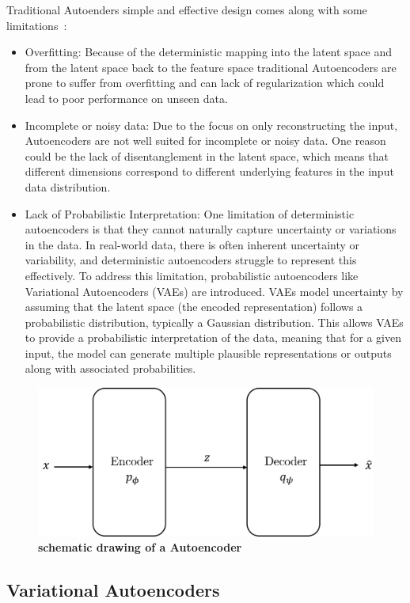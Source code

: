 Traditional Autoenders simple and effective design comes along with some limitations~\cite{pml2Book}:
\begin{itemize}
	\item Overfitting: Because of the deterministic mapping into the latent space and from the latent space back to the feature space traditional Autoencoders are prone to suffer from overfitting and can lack of regularization which could lead to poor performance on unseen data.
	\item Incomplete or noisy data: Due to the focus on only reconstructing the input, Autoencoders are not well suited for incomplete or noisy data. One reason could be the lack of disentanglement in the latent space, which means that different dimensions correspond to different underlying features in the input data distribution. 
	\item Lack of Probabilistic Interpretation: One limitation of deterministic autoencoders is that they cannot naturally capture uncertainty or variations in the data. In real-world data, there is often inherent uncertainty or variability, and deterministic autoencoders struggle to represent this effectively. To address this limitation, probabilistic autoencoders like Variational Autoencoders (VAEs) are introduced. VAEs model uncertainty by assuming that the latent space (the encoded representation) follows a probabilistic distribution, typically a Gaussian distribution. This allows VAEs to provide a probabilistic interpretation of the data, meaning that for a given input, the model can generate multiple plausible representations or outputs along with associated probabilities.
\end{itemize}
\begin{figure}
    \centering
    \includegraphics[width=0.5\linewidth]{figures/background/Autoencoder.png}
    \caption[Autoencoder schematics]{\textbf{schematic drawing of a Autoencoder}}
    \label{fig:Autoencoder_schematics}
\end{figure}

\subsection{Variational Autoencoders}\label{sec:VAE}

